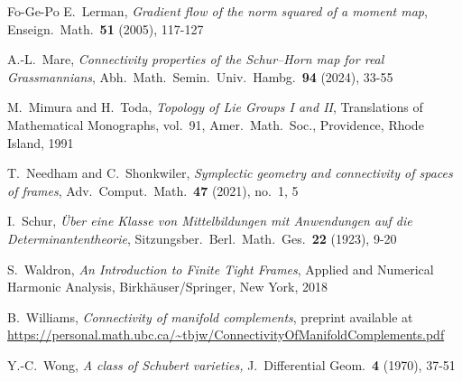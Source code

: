 \documentclass[12pt]{amsart}
\theoremstyle{definition}
\theoremstyle{remark}
\begin{document}
\begin{thebibliography}{Fo-Ge-Po}
 E.~Lerman, {\it Gradient flow of the norm squared of a moment map}, Enseign.~Math.~{\bf 51} (2005), 117-127

 A.-L.~Mare, {\it Connectivity properties of the Schur–Horn map for real Grassmannians}, Abh.~Math.~Semin.~Univ.~Hambg.~{\bf 94} (2024), 33-55

  M.~Mimura and H.~Toda, {\it Topology of Lie Groups I and II}, Translations of Mathematical Monographs, vol.~91, Amer.~Math.~Soc., Providence, Rhode Island, 1991

 T.~Needham and C.~Shonkwiler, {\it Symplectic geometry and connectivity of spaces of frames},  Adv.~Comput.~Math.~{\bf 47} (2021), no.~1, 5


 I.~Schur, {\it \"Uber eine Klasse von Mittelbildungen mit Anwendungen auf die Determinantentheorie}, 
Sitzungsber.~Berl.~Math.~Ges.~{\bf 22} (1923), 9-20

 S.~Waldron, {\it An Introduction to Finite Tight Frames},
Applied and Numerical Harmonic Analysis, Birkh\"auser/Springer, New York, 2018

 B.~Williams, {\it Connectivity of manifold complements}, preprint available at
\url{https://personal.math.ubc.ca/~tbjw/ConnectivityOfManifoldComplements.pdf}

 Y.-C.~Wong, {\it A class of Schubert varieties,} J.~Differential Geom.~{\bf 4} (1970), 37-51




\end{thebibliography}
\end{document}

